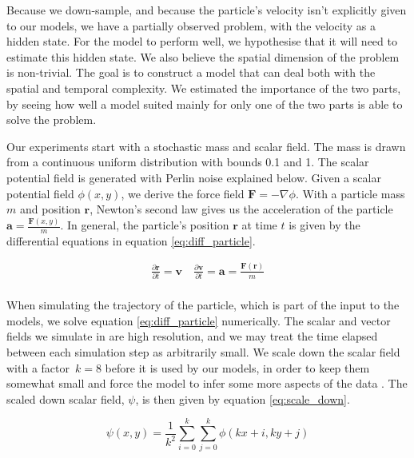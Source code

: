 \documentclass[a4paper]{article}
\renewcommand{\vec}[1]{\mathbf{#1}}
\begin{document}
Because we down-sample, and because the particle's velocity isn't explicitly given to our models, we have a partially observed problem, with the velocity as a hidden state. For the model to perform well, we hypothesise that it will need to estimate this hidden state. We also believe the spatial dimension of the problem is non-trivial. The goal is to construct a model that can deal both with the spatial and temporal complexity. We estimated the importance of the two parts, by seeing how well a model suited mainly for only one of the two parts is able to solve the problem.

Our experiments start with a stochastic mass and scalar field. The mass is drawn from a continuous uniform distribution with bounds 0.1 and 1. The scalar potential field is generated with Perlin noise explained below. Given a scalar potential field $\phi(x, y)$, we derive the force field  $\vec{F} = - \nabla\phi$. With a particle mass $m$ and position $\vec{r}$, Newton's second law gives us the acceleration of the particle $\vec{a} = \frac{\vec{F}(x, y)}{m}$. In general, the particle's position $\vec{r}$ at time $t$ is given by the differential equations in equation \ref{eq:diff_particle}.

\begin{equation}
    \label{eq:diff_particle}
    \begin{split}
    \frac{\partial \vec{r}}{\partial t} = \vec{v} \quad
    \frac{\partial \vec{v}}{\partial t} = \vec{a} = \frac{\vec{F}(\vec{r})}{m} \\
    \end{split}
\end{equation}

When simulating the trajectory of the particle, which is part of the input to the models, we solve equation \ref{eq:diff_particle} numerically. The scalar and vector fields we simulate in are high resolution, and we may treat the time elapsed between each simulation step as arbitrarily small. We scale down the scalar field with a factor~$k=8$ before it is used by our models, in order to keep them somewhat small and force the model to infer some more aspects of the data . The scaled down scalar field, $\psi$, is then given by
equation \ref{eq:scale_down}.

\begin{equation}
    \label{eq:scale_down}
    \psi(x,y) = \frac{1}{k^2}
      \sum_{i=0}^k\sum_{j=0}^k \phi(kx + i, ky + j)
\end{equation}
\end{document}
